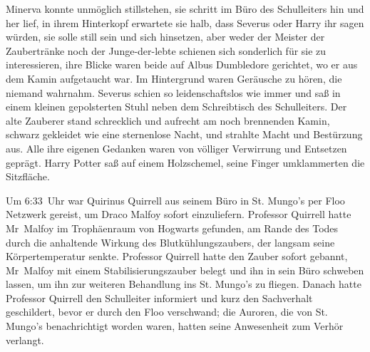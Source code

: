 Minerva konnte unmöglich stillstehen, sie schritt im Büro des Schulleiters hin und her lief, in ihrem Hinterkopf erwartete sie halb, dass Severus oder Harry ihr sagen würden, sie solle still sein und sich hinsetzen, aber weder der Meister der Zaubertränke noch der Junge-der-lebte schienen sich sonderlich für sie zu interessieren, ihre Blicke waren beide auf Albus Dumbledore gerichtet, wo er aus dem Kamin aufgetaucht war. Im Hintergrund waren Geräusche zu hören, die niemand wahrnahm. Severus schien so leidenschaftslos wie immer und saß in einem kleinen gepolsterten Stuhl neben dem Schreibtisch des Schulleiters.
Der alte Zauberer stand schrecklich und aufrecht am noch brennenden Kamin, schwarz gekleidet wie eine sternenlose Nacht, und strahlte Macht und Bestürzung aus. Alle ihre eigenen Gedanken waren von völliger Verwirrung und Entsetzen geprägt. Harry Potter saß auf einem Holzschemel, seine Finger umklammerten die Sitzfläche.

Um 6:33~Uhr war Quirinus Quirrell aus seinem Büro in St. Mungo’s per Floo Netzwerk gereist, um Draco Malfoy sofort einzuliefern. Professor Quirrell hatte Mr~Malfoy im Trophäenraum von Hogwarts gefunden, am Rande des Todes durch die anhaltende Wirkung des Blutkühlungszaubers, der langsam seine Körpertemperatur senkte. Professor Quirrell hatte den Zauber sofort gebannt, Mr~Malfoy mit einem Stabilisierungszauber belegt und ihn in sein Büro schweben lassen, um ihn zur weiteren Behandlung ins St. Mungo’s zu fliegen. Danach hatte Professor Quirrell den Schulleiter informiert und kurz den Sachverhalt geschildert, bevor er durch den Floo verschwand; die Auroren, die von St. Mungo’s benachrichtigt worden waren, hatten seine Anwesenheit zum Verhör verlangt.

